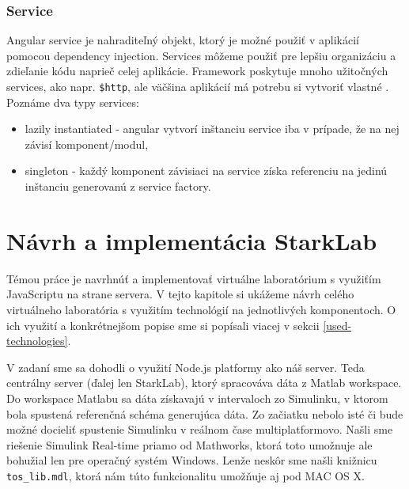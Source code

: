 \subsubsection{Service}
Angular service je nahraditeľný objekt, ktorý je možné použiť v aplikácií pomocou dependency injection. Services môžeme použiť pre lepšiu organizáciu a zdieľanie kódu naprieč celej aplikácie. Framework poskytuje mnoho užitočných services, ako napr. \verb|$http|, ale väčšina aplikácií má potrebu si vytvoriť vlastné \cite{angular-docs}.
Poznáme dva typy services:
\begin{itemize}
\item lazily instantiated - angular vytvorí inštanciu service iba v prípade, že na nej závisí komponent/modul,
\item singleton - každý komponent závisiaci na service získa referenciu na jedinú inštanciu generovanú z service factory.
\end{itemize}


\section{Návrh a implementácia StarkLab}
\indent Témou práce je navrhnúť a implementovať virtuálne laboratórium s využiťím JavaScriptu na strane servera. V tejto kapitole si ukážeme návrh celého virtuálneho laboratória s využitím technológií na jednotlivých komponentoch. O ich využití a konkrétnejšom popise sme si popísali viacej v sekcii \ref{used-technologies}.

V zadaní sme sa dohodli o využití Node.js platformy ako náš server. Teda centrálny server (ďalej len StarkLab), ktorý spracováva dáta z Matlab workspace. Do workspace Matlabu sa dáta získavajú v intervaloch zo Simulinku, v ktorom bola spustená referenčná schéma generujúca dáta. Zo začiatku nebolo isté či bude možné docieliť spustenie Simulinku v reálnom čase multiplatformovo. Našli sme riešenie Simulink Real-time priamo od Mathworks, ktorá toto umožnuje ale bohužial len pre operačný systém Windows. Lenže neskôr sme našli knižnicu \verb|tos_lib.mdl|, ktorá nám túto funkcionalitu umožňuje aj pod MAC OS X.

